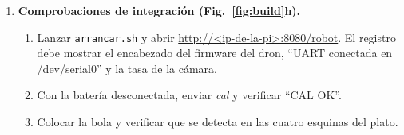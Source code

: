 \begin{enumerate}[label=\textbf{Paso \arabic*.}, leftmargin=*, align=left]
  \item \textbf{Comprobaciones de integración (Fig.~\ref{fig:build}h).}
  \begin{enumerate}[label=(\alph*)]
    \item Lanzar \texttt{arrancar.sh} y abrir \url{http://<ip-de-la-pi>:8080/robot}. El registro debe mostrar el encabezado del firmware del dron, ``UART conectada en /dev/serial0'' y la tasa de la cámara.
    \item Con la batería desconectada, enviar \emph{cal} y verificar ``CAL OK''.
    \item Colocar la bola y verificar que se detecta en las cuatro esquinas del plato.
  \end{enumerate}
\end{enumerate}
